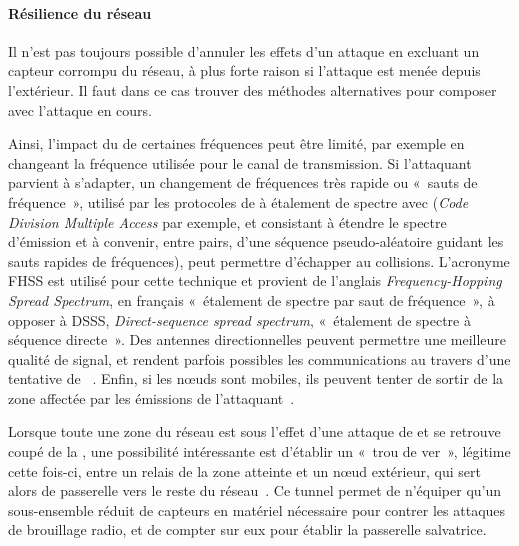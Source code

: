 \paragraph{Résilience du réseau}
Il n'est pas toujours possible d'annuler les effets d'un attaque en excluant un capteur corrompu du réseau, à plus forte raison si l'attaque est menée depuis l'extérieur.
Il faut dans ce cas trouver des méthodes alternatives pour composer avec l'attaque en cours.

Ainsi, l'impact du  de certaines fréquences peut être limité, par exemple en changeant la fréquence utilisée pour le canal de transmission.
Si l'attaquant parvient à s'adapter, un changement de fréquences très rapide ou « sauts de fréquence », utilisé par les protocoles de  à étalement de spectre avec \cdma (\textit{Code Division Multiple Access} par exemple, et consistant à étendre le spectre d'émission et à convenir, entre pairs, d'une séquence pseudo-aléatoire guidant les sauts rapides de fréquences), peut permettre d'échapper au collisions.
L'acronyme FHSS est utilisé pour cette technique et provient de l'anglais \textit{Frequency-Hopping Spread Spectrum}, en français « étalement de spectre par saut de fréquence », à opposer à DSSS, \textit{Direct-sequence spread spectrum}, \cad « étalement de spectre à séquence directe ».
Des antennes directionnelles peuvent permettre une meilleure qualité de signal, et rendent parfois possibles les communications au travers d'une tentative de ~\cite{PI11}.
Enfin, si les nœuds sont mobiles, ils peuvent tenter de sortir de la zone affectée par les émissions de l'attaquant~\cite{PI11}.

Lorsque toute une zone du réseau est sous l'effet d'une attaque de  et se retrouve coupé de la \sdb, une possibilité intéressante est d'établir un « trou de ver », légitime cette fois-ci, entre un relais de la zone atteinte et un nœud extérieur, qui sert alors de passerelle vers le reste du réseau~\cite{CCH07}.
Ce tunnel permet de n'équiper qu'un sous-ensemble réduit de capteurs en matériel nécessaire pour contrer les attaques de brouillage radio, et de compter sur eux pour établir la passerelle salvatrice.

